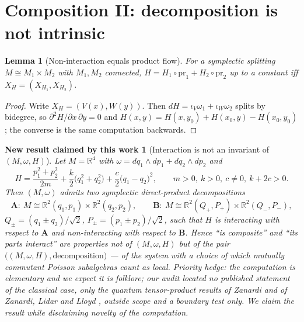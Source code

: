 \documentclass[12pt,a4paper]{article}
\theoremstyle{definition}
\theoremstyle{plain}
\newtheorem{lemma}[definition]{Lemma}
\theoremstyle{commentary}
\newtheorem{newresult}[definition]{New result claimed by this work}
\newcommand{\R}{\mathbb{R}}
\newcommand{\prm}{\mathrm{pr}}
\begin{document}
\section{Composition II: decomposition is not intrinsic}\label{sec:decomp}

\begin{lemma}[Non-interaction equals product flow]\label{lem:prodflow}
For a symplectic splitting $M\cong M_1\times M_2$ with $M_1,M_2$ connected,
$H=H_1\circ\prm_1+H_2\circ\prm_2$ up to a constant \emph{iff} $X_H=(X_{H_1},X_{H_2})$.
\end{lemma}
\begin{proof}
Write $X_H=(V(x),W(y))$. Then $dH=\iota_V\omega_1+\iota_W\omega_2$ splits by
bidegree, so $\partial^{2}H/\partial x\,\partial y=0$ and
$H(x,y)=H(x,y_0)+H(x_0,y)-H(x_0,y_0)$; the converse is the same computation backwards.
\end{proof}

\begin{newresult}[Interaction is not an invariant of $(M,\omega,H)$]\label{thm:twodecomp}
Let $M=\R^{4}$ with $\omega=dq_1\wedge dp_1+dq_2\wedge dp_2$ and
\[
 H=\frac{p_1^{2}+p_2^{2}}{2m}+\frac{k}{2}\bigl(q_1^{2}+q_2^{2}\bigr)
 +\frac{c}{2}\bigl(q_1-q_2\bigr)^{2},\qquad m>0,\ k>0,\ c\neq0,\ k+2c>0 .
\]
Then $(M,\omega)$ admits two symplectic direct-product decompositions
\[
 \textbf{A}:\ M\cong \R^{2}(q_1,p_1)\times\R^{2}(q_2,p_2),\qquad
 \textbf{B}:\ M\cong \R^{2}(Q_+,P_+)\times\R^{2}(Q_-,P_-),
\]
$Q_\pm=(q_1\pm q_2)/\sqrt2$, $P_\pm=(p_1\pm p_2)/\sqrt2$, such that $H$ is interacting with
respect to $\textbf{A}$ and non-interacting with respect to $\textbf{B}$. Hence ``is
composite'' and ``its parts interact'' are properties not of $(M,\omega,H)$ but of the pair
$\bigl((M,\omega,H),\text{decomposition}\bigr)$ --- of the system with a choice of which
mutually commutant Poisson subalgebras count as local. \emph{Priority hedge:} the computation
is elementary and we expect it is folklore; our audit located no published statement of the
\emph{classical} case, only the quantum tensor-product results of Zanardi and of Zanardi,
Lidar and Lloyd \cite{Zanardi2001,ZanardiLidarLloyd2004}, outside scope and a boundary test
only. We claim the result while disclaiming novelty of the computation.
\end{newresult}
\end{document}

